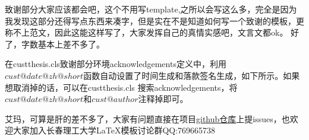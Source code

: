 
\begin{acknowledgements}

致谢部分大家应该都会吧，这个不用写template,之所以会写这么多，完全是因为我发现这部分还得写点东西来凑字，但是实在不是知道如何写一个致谢的模板，更称不上范文，因此这能这样写了，大家发挥自己的真情实感吧，文言文都ok。
好了，字数基本上差不多了。

在custthesis.cls致谢部分环境acknowledgements定义中，利用$cust@date@zh@short$函数自动设置了时间生成和落款签名生成，如下所示。如果想取消掉的话，可以在custthesis.cls 搜索acknowledgements，将$cust@date@zh@short$和$cust@author$注释掉即可。

艾玛，可算是肝的差不多了，大家有问题直接在项目\href{https://github.com/CVIR-Lab/LaTeX-template-for-CUST-thesis}{github仓库}上提issues，也欢迎大家加入长春理工大学\LaTeX{}模板讨论群QQ:769665738

\end{acknowledgements}

